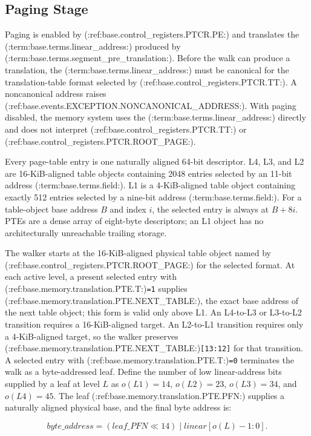 \subsection{Paging Stage}

Paging is enabled by (:ref:base.control_registers.PTCR.PE:) and translates the (:term:base.terms.linear_address:) produced by (:term:base.terms.segment_pre_translation:). Before
the walk can produce a translation, the (:term:base.terms.linear_address:) must be canonical for the translation-table format selected by
(:ref:base.control_registers.PTCR.TT:). A noncanonical address raises (:ref:base.events.EXCEPTION.NONCANONICAL_ADDRESS:). With paging disabled, the memory system uses
the (:term:base.terms.linear_address:) directly and does not interpret (:ref:base.control_registers.PTCR.TT:) or (:ref:base.control_registers.PTCR.ROOT_PAGE:).

Every page-table entry is one naturally aligned 64-bit descriptor. L4, L3, and
L2 are 16-KiB-aligned table objects containing 2048 entries selected by an
11-bit address (:term:base.terms.field:). L1 is a 4-KiB-aligned table object containing exactly 512
entries selected by a nine-bit address (:term:base.terms.field:). For a table-object base address $B$
and index $i$, the selected entry is always at $B+8i$. PTEs are a dense array
of eight-byte descriptors; an L1 object has no architecturally unreachable
trailing storage.

The walker starts at the 16-KiB-aligned physical table object named by (:ref:base.control_registers.PTCR.ROOT_PAGE:) for the selected format. At each active level,
a present selected entry with (:ref:base.memory.translation.PTE.T:)\texttt{=1} supplies
(:ref:base.memory.translation.PTE.NEXT_TABLE:), the exact base address of the next table object; this form is valid only above L1.
An L4-to-L3 or L3-to-L2 transition requires a 16-KiB-aligned target. An
L2-to-L1 transition requires only a 4-KiB-aligned target, so the walker
preserves (:ref:base.memory.translation.PTE.NEXT_TABLE:)\texttt{[13:12]} for that transition.
A selected entry with (:ref:base.memory.translation.PTE.T:)\texttt{=0} terminates the walk as a byte-addressed leaf. Define the number of low
linear-address bits supplied by a leaf at level $L$ as $o(L1)=14$, $o(L2)=23$, $o(L3)=34$, and $o(L4)=45$. The leaf
(:ref:base.memory.translation.PTE.PFN:) supplies a naturally aligned physical base, and the final byte address is:

\[
  \mathit{byte\_address} = (\mathit{leaf\_PFN} \ll 14) \mathbin{|}
  \mathit{linear}[o(L)-1:0].
\]

